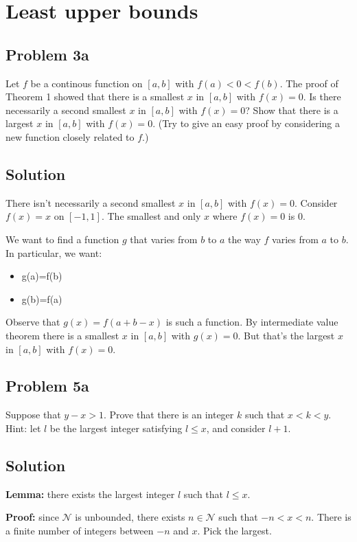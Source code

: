 \section{Least upper bounds}
\subsection*{Problem 3a}
Let $f$ be a continous function on $[a, b]$ with $f(a)<0<f(b)$. The
proof of Theorem 1 showed that there is a smallest $x$ in $[a,b]$ with
$f(x)=0$. Is there necessarily a second smallest $x$ in $[a,b]$ with
$f(x)=0$? Show that there is a largest $x$ in $[a,b]$ with $f(x)=0$.
(Try to give an easy proof by considering a new function closely
related to $f$.)

\subsection*{Solution}
There isn't necessarily a second smallest $x$ in $[a,b]$ with
$f(x)=0$. Consider $f(x)=x$ on $[-1,1]$. The smallest and only $x$
where $f(x)=0$ is $0$.

\vs

We want to find a function $g$ that varies from $b$ to $a$ the way $f$
varies from $a$ to $b$. In particular, we want:
\begin{itemize}
\item g(a)=f(b)
\item g(b)=f(a)
\end{itemize}

Observe that $g(x)=f(a+b-x)$ is such a function. By intermediate value
theorem there is a smallest $x$ in $[a,b]$ with $g(x)=0$. But that's
the largest $x$ in $[a,b]$ with $f(x)=0$.

\subsection*{Problem 5a}
Suppose that $y-x>1$. Prove that there is an integer $k$ such that
$x<k<y$. Hint: let $l$ be the largest integer satisfying $l\leq x$, and
consider $l+1$.

\subsection*{Solution}
\textbf{Lemma:} there exists the largest integer $l$ such that $l\leq x$.

\textbf{Proof:} since $\mathcal{N}$ is unbounded, there exists
$n\in\mathcal{N}$ such that $-n<x<n$. There is a finite number of integers between
$-n$ and $x$. Pick the largest.

